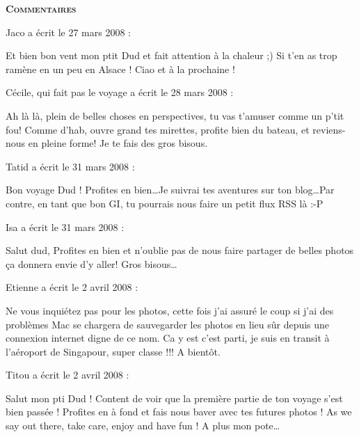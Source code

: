 \bigskip
\textbf{\textsc{Commentaires}}

\medskip
Jaco a écrit le 27 mars 2008 :
\begin{displayquote}
Et bien bon vent mon ptit Dud et fait attention à la chaleur ;) Si t'en as trop ramène en un peu en Alsace !
Ciao et à la prochaine !
\end{displayquote}

\medskip
Cécile, qui fait pas le voyage a écrit le 28 mars 2008 :
\begin{displayquote}
Ah là là, plein de belles choses en perspectives, tu vas t'amuser comme un p'tit fou! Comme d'hab, ouvre grand tes mirettes, profite bien du bateau, et reviens-nous en pleine forme!
Je te fais des gros bisous.
\end{displayquote}

\medskip
Tatid a écrit le 31 mars 2008 :
\begin{displayquote}
Bon voyage Dud ! Profites en bien\dots Je suivrai tes aventures sur ton blog\dots Par contre, en tant que bon GI, tu pourrais nous faire un petit flux RSS là :-P
\end{displayquote}

\medskip
Isa a écrit le 31 mars 2008 :
\begin{displayquote}
Salut dud,
Profites en bien et n'oublie pas de nous faire partager de belles photos ça donnera envie d'y aller!
Gros bisous\dots
\end{displayquote}

\medskip
Etienne a écrit le 2 avril 2008 :
\begin{displayquote}
Ne vous inquiétez pas pour les photos, cette fois j'ai assuré le coup si j'ai des problèmes Mac se chargera de sauvegarder les photos en lieu sûr depuis une connexion internet digne de ce nom.
Ca y est c'est parti, je suis en transit à l'aéroport de Singapour, super classe !!!
A bientôt.
\end{displayquote}

\medskip
Titou a écrit le 2 avril 2008 :
\begin{displayquote}
Salut mon pti Dud ! Content de voir que la première partie de ton voyage s'est bien passée ! Profites en à fond et fais nous baver avec tes futures photos !
As we say out there, take care, enjoy and have fun !
A plus mon pote\dots
\end{displayquote}

\vfill
